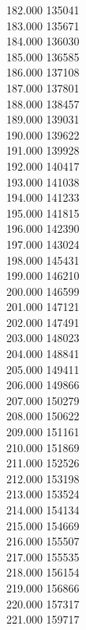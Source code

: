 { 182.000	135041 \\
 183.000	135671 \\
 184.000	136030 \\
 185.000	136585 \\
 186.000	137108 \\
 187.000	137801 \\
 188.000	138457 \\
 189.000	139031 \\
 190.000	139622 \\
 191.000	139928 \\
 192.000	140417 \\
 193.000	141038 \\
 194.000	141233 \\
 195.000	141815 \\
 196.000	142390 \\
 197.000	143024 \\
 198.000	145431 \\
 199.000	146210 \\
 200.000	146599 \\
 201.000	147121 \\
 202.000	147491 \\
 203.000	148023 \\
 204.000	148841 \\
 205.000	149411 \\
 206.000	149866 \\
 207.000	150279 \\
 208.000	150622 \\
 209.000	151161 \\
 210.000	151869 \\
 211.000	152526 \\
 212.000	153198 \\
 213.000	153524 \\
 214.000	154134 \\
 215.000	154669 \\
 216.000	155507 \\
 217.000	155535 \\
 218.000	156154 \\
 219.000	156866 \\
 220.000	157317 \\
 221.000	159717 \\
}
